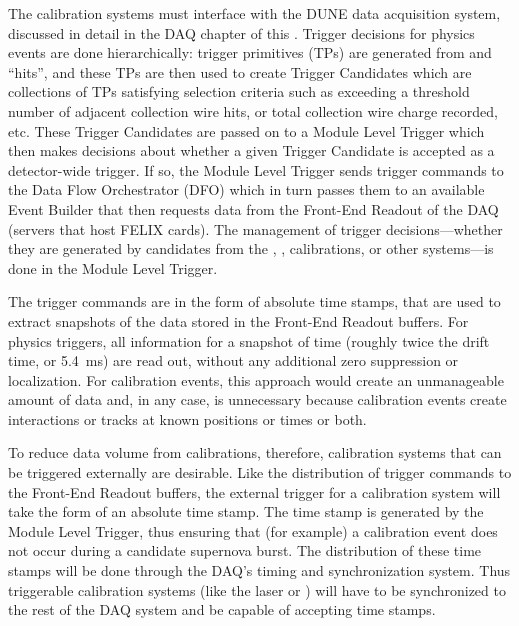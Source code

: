 
The calibration systems must interface with the DUNE data acquisition system, discussed in detail in
the DAQ chapter of this . 
Trigger decisions for physics events are done hierarchically: trigger primitives (TPs) are generated from  and  ``hits'', and these TPs are then used to create Trigger Candidates which are collections of TPs satisfying selection criteria such as exceeding a threshold number of adjacent collection wire hits, or total collection wire charge recorded, etc. These Trigger Candidates are passed on to a Module Level Trigger which then makes decisions about whether a given Trigger Candidate is accepted as a detector-wide trigger.  If so, the Module Level Trigger sends trigger commands to the Data Flow Orchestrator (DFO) which in turn passes them to an available Event Builder that then requests data from the Front-End Readout of the DAQ (servers that host FELIX cards). The management of trigger decisions---whether they are generated by candidates from the , , calibrations, or other systems---is done in the Module Level Trigger.  

The trigger commands are in the form of absolute time stamps, that are used to extract snapshots of the data stored in the Front-End Readout buffers. For physics triggers, all  information for a snapshot of time (roughly twice the drift time, or \SI{5.4}{\milli\s}) are read out, without any additional zero suppression or localization. For calibration events, this approach would create an unmanageable amount of data and, in any case, is unnecessary because calibration events create interactions or tracks at known positions or times or both.


    
    To reduce data volume from calibrations, therefore, calibration systems that can be triggered externally are desirable. Like the distribution of trigger commands to the Front-End Readout buffers, the external trigger for a calibration system will take the form of an absolute time stamp. The time stamp is generated by the Module Level Trigger, thus ensuring that (for example) a calibration event does not occur during a candidate supernova burst.  The distribution of these time stamps will be done through the DAQ's timing and synchronization system. Thus triggerable calibration systems (like the laser or ) will have to be synchronized to the rest of the DAQ system and be capable of accepting time stamps.

